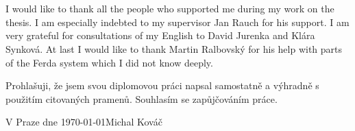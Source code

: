 \documentclass[a4paper,12pt]{book}
\begin{document}
~

\newpage

\normalsize %
\ \vspace{10mm}

\noindent I would like to thank all the people who supported me during my work on the thesis. I am especially indebted to my supervisor Jan Rauch for his support. I am very grateful for consultations of my English to David Jurenka and Klára Synková. At last I would like to thank Martin Ralbovský for his help with parts of the Ferda system which I did not know deeply.

\vspace{\fill}
Prohlašuji, že jsem svou diplomovou práci napsal samostatně a výhradně s použitím citovaných pramenů. Souhlasím se zapůjčováním práce.

\bigskip

\noindent V Praze dne \today \hspace{\fill}Michal Kováč\\

\tableofcontents
\end{document}
